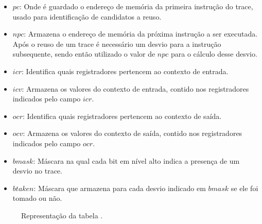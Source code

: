 \begin{itemize}
	\item $pc$: Onde é guardado o endereço de memória da primeira instrução do trace, usado para identificação de candidatos a reuso.
	\item $npc$: Armazena o endereço de memória da próxima instrução a ser executada. Após o reuso de um trace é necessário um desvio para a instrução subsequente, sendo então utilizado o valor de $npc$ para o cálculo desse desvio.
	\item $icr$: Identifica quais registradores pertencem ao contexto de entrada.
	\item $icv$: Armazena os valores do contexto de entrada, contido nos registradores indicados pelo campo $icr$.
	\item $ocr$: Identifica quais registradores pertencem ao contexto de saída.
	\item $ocv$: Armazena os valores do contexto de saída, contido nos registradores indicados pelo campo $ocr$.
	\item $bmask$: Máscara na qual cada bit em nível alto indica a presença de um desvio no trace.
	\item $btaken$: Máscara que armazena para cada desvio indicado em $bmask$ se ele foi tomado ou não.
\end{itemize}

\begin{figure}
	\label{Fig:MemoTableT}
	\caption[Representação da tabela \tablet]{
		Representação da tabela \tablet.}
	\begin{center}
		\newcommand{\tabela}[1]{
			\multicolumn{1}{|@{ }c@{ }|}{#1}
		}
		
		\newcommand{\tabelatripla}[2]{
			\tabela{$#1_{1}$} & \tabela{\hdots} & \tabela{$#1_{#2}$}
		}
		
		\tiny
		\normalsize
		
	\end{center}
\end{figure}

